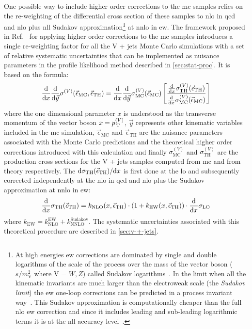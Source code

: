 One possible way to include higher order corrections to the \gls{mc} samples
relies on the re-weighting of the differential cross section of these samples to
\gls{nlo} in \gls{qcd} and \gls{nlo} plus \gls{nll} Sudakov
approximation\footnote{At high energies \gls{ew} corrections are dominated by
  single and double logarithms of the scale of the process over the mass of the
  vector boson ($s/m_\mathrm{V}^2$ where V = $W, Z$) called Sudakov
  logarithms~\cite{SudakovLogs}. In the limit when all the kinematic invariants
  are much larger than the electroweak scale (the \emph{Sudakov limit}) the
  \gls{ew} one-loop corrections can be predicted in a process invariant
  way~\cite{SudakovApproximation}. This Sudakov approximation is computationally
  cheaper than the full \gls{nlo} \gls{ew} correction and since it includes
  leading and sub-leading logarithmic terms it is at the \gls{nll} accuracy
  level~\cite{SudakovApproximation}.} at \gls{nnlo} in \gls{ew}. The framework
proposed in Ref.~\cite{VplusJetsCorrections} for applying higher order
corrections to the \gls{mc} samples introduces a single re-weighting factor for
all the V + jets Monte Carlo simulations with a set of relative systematic
uncertainties that can be implemented as nuisance parameters in the profile
likelihood method described in \cref{sec:stat-proc}. It is based on the formula:
\begin{equation}
  \label{eq:51}
  \frac{\mathrm{d}}{\mathrm{d} x} \frac{\mathrm{d}}{\mathrm{d} \vec{y}} \sigma^{(V)}
  (\vec{\epsilon}_\mathrm{MC}, \vec{\epsilon}_\mathrm{TH}) = \frac{\mathrm{d}}{\mathrm{d} x}
  \frac{\mathrm{d}}{\mathrm{d} \vec{y}} \sigma_\mathrm{MC}^{(V)}(\vec{\epsilon}_\mathrm{MC})
  \left[ \frac{\frac{\mathrm{d}}{\mathrm{d} x}
      \sigma_\mathrm{TH}^{(V)}(\vec{\epsilon}_\mathrm{TH})}{\frac{\mathrm{d}}{\mathrm{d} x}
      \sigma_\mathrm{MC}^{(V)}(\vec{\epsilon}_\mathrm{MC})} \right]
\end{equation}
where the one dimensional parameter $x$ is understood as the transverse momentum
of the vector boson $x = p_\mathrm{\, T}^{(V)}$, $\vec{y}$ represents other kinematic
variables included in the \gls{mc} simulation, $\vec{\epsilon}_\mathrm{MC}$ and
$\vec{\epsilon}_\mathrm{TH}$ are the nuisance parameters associated with the
Monte Carlo predictions and the theoretical higher order corrections introduced
with this calculation and finally $\sigma_\mathrm{MC}^{(V)}$ and
$\sigma_\mathrm{TH}^{(V)}$ are the production cross sections for the V + jets
samples computed from \gls{mc} and from theory respectively. The
$\mathrm{d} \sigma_\mathrm{TH}(\vec{\epsilon}_\mathrm{TH})/\mathrm{d} x$ is first done at the
\gls{lo} and subsequently corrected independently at the \gls{nlo} in \gls{qcd}
and \gls{nlo} plus the Sudakov approximation at \gls{nnlo} in \gls{ew}:
\begin{equation}
  \label{eq:176}
  \frac{\mathrm{d}}{\mathrm{d} x} \sigma_\mathrm{TH}(\vec{\epsilon}_\mathrm{TH}) =
  k_\mathrm{NLO}(x, \vec{\epsilon}_\mathrm{TH}) \cdot \left(1 + k_\mathrm{EW}(x,
    \vec{\epsilon}_\mathrm{TH}) \right) \cdot \frac{\mathrm{d}}{\mathrm{d} x} \sigma_\mathrm{LO}
\end{equation}
where $k_\mathrm{EW} = k_\mathrm{NLO}^\mathrm{EW} +
k_\mathrm{NNLO}^\mathrm{Sudakov}$. The systematic uncertainties associated with
this theoretical procedure are described in \cref{sec:v-+-jets}.
